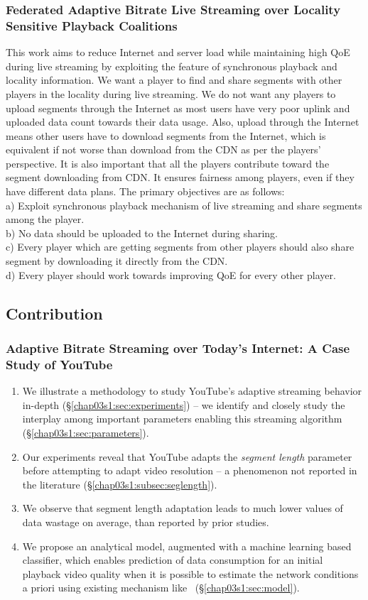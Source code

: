 \subsubsection{Federated Adaptive Bitrate Live Streaming over Locality Sensitive Playback Coalitions}
This work aims to reduce Internet and server load while maintaining high QoE during live streaming by exploiting the feature of synchronous playback and locality information. We want a player to find and share segments with other players in the locality during live streaming. We do not want any players to upload segments through the Internet as most users have very poor uplink and uploaded data count towards their data usage. Also, upload through the Internet means other users have to download segments from the Internet, which is equivalent if not worse than download from the CDN as per the players' perspective. It is also important that all the players contribute toward the segment downloading from CDN. It ensures fairness among players, even if they have different data plans. The primary objectives are as follows: \\
a) Exploit synchronous playback mechanism of live streaming and share segments among the player.\\
b) No data should be uploaded to the Internet during sharing.\\
c) Every player which are getting segments from other players should also share segment by downloading it directly from the CDN. \\
d) Every player should work towards improving QoE for every other player.

\subsection{Contribution}
\subsubsection{Adaptive Bitrate Streaming over Today's Internet: A Case Study of YouTube}
\begin{enumerate}
	\item We illustrate a methodology to study YouTube's adaptive streaming behavior in-depth (\S\ref{chap03s1:sec:experiments}) -- we identify and closely study the interplay among important parameters enabling this streaming algorithm (\S\ref{chap03s1:sec:parameters}).
	\item Our experiments reveal that YouTube adapts the {\it segment length} parameter before attempting to adapt video resolution -- a phenomenon not reported in the literature (\S\ref{chap03s1:subsec:seglength}).
	\item We observe that segment length adaptation leads to much lower values of data wastage on average, than reported by prior studies.
	\item We propose an analytical model, augmented with a machine learning based classifier, which enables prediction of data consumption for an initial playback video quality when it is possible to estimate the network conditions a priori using existing mechanism like~\cite{Zou2015}  (\S\ref{chap03s1:sec:model}).
\end{enumerate}

